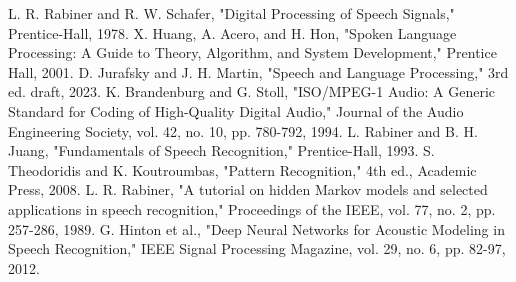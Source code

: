 \documentclass[10pt,journal,compsoc]{IEEEtran}
\begin{document}
\begin{thebibliography}{00}
 L. R. Rabiner and R. W. Schafer, "Digital Processing of Speech Signals," Prentice-Hall, 1978.
 X. Huang, A. Acero, and H. Hon, "Spoken Language Processing: A Guide to Theory, Algorithm, and System Development," Prentice Hall, 2001.
 D. Jurafsky and J. H. Martin, "Speech and Language Processing," 3rd ed. draft, 2023.
 K. Brandenburg and G. Stoll, "ISO/MPEG-1 Audio: A Generic Standard for Coding of High-Quality Digital Audio," Journal of the Audio Engineering Society, vol. 42, no. 10, pp. 780-792, 1994.
 L. Rabiner and B. H. Juang, "Fundamentals of Speech Recognition," Prentice-Hall, 1993.
 S. Theodoridis and K. Koutroumbas, "Pattern Recognition," 4th ed., Academic Press, 2008.
 L. R. Rabiner, "A tutorial on hidden Markov models and selected applications in speech recognition," Proceedings of the IEEE, vol. 77, no. 2, pp. 257-286, 1989.
 G. Hinton et al., "Deep Neural Networks for Acoustic Modeling in Speech Recognition," IEEE Signal Processing Magazine, vol. 29, no. 6, pp. 82-97, 2012.
\end{thebibliography}
\end{document}
